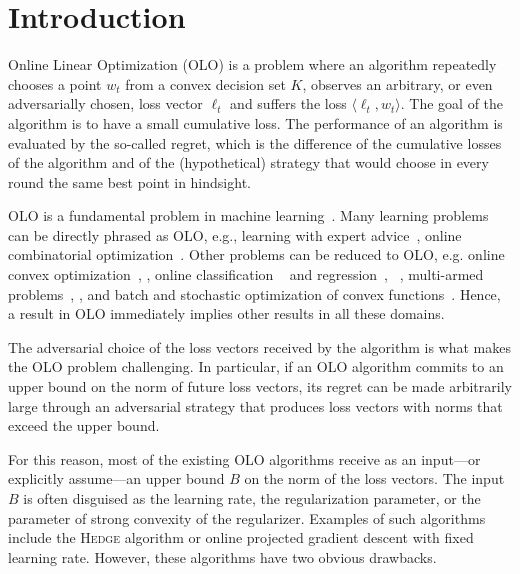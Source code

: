 \section{Introduction}
\label{section:introduction}

Online Linear Optimization (OLO) is a problem where an algorithm repeatedly
chooses a point $w_t$ from a convex decision set $K$, observes an arbitrary, or
even adversarially chosen, loss vector $\ell_t$ and suffers the loss $\langle
\ell_t, w_t \rangle$.  The goal of the algorithm is to have a small cumulative
loss. The performance of an algorithm is evaluated by the so-called regret,
which is the difference of the cumulative losses of the algorithm and of the
(hypothetical) strategy that would choose in every round the same best point in
hindsight.

OLO is a fundamental problem in machine
learning~\cite{Cesa-Bianchi-Lugosi-2006, Rakhlin-Sridharan-2009,
Shalev-Shwartz-2011}.  Many learning problems can be directly phrased as OLO,
e.g., learning with expert advice~\cite{Littlestone-Warmuth-1994, Vovk-1998,
Freund-Schapire-1997, Cesa-Bianchi-Haussler-Helmbold-Schapire-Warmuth-1997},
online combinatorial optimization~\cite{Kalai-Vempala-2005,
Helmbold-Warmuth-2009, Koolen-Warmuth-Kivinen-2010}. Other problems can be
reduced to OLO, e.g. online convex
optimization~\cite{Abernethy-Bartlett-Rakhlin-Tewari-2008},
\cite[Chapter~2]{Shalev-Shwartz-2011}, online classification
~\cite{Rosenblatt-1958,Freund-Schapire-1999} and
regression~\cite{Kivinen-Warmuth-1997},
~\cite[Chapters~11~and~12]{Cesa-Bianchi-Lugosi-2006}, multi-armed
problems~\cite[Chapter~6]{Cesa-Bianchi-Lugosi-2006},
\cite{Abernethy-Hazan-Rakhlin-2008, Bubeck-Cesa-Bianchi-2012}, and batch
and stochastic optimization of convex functions~\cite{Nemirovski-Yudin-1983,
Bubeck-2015}.  Hence, a result in OLO immediately implies other results in all
these domains.

The adversarial choice of the loss vectors received by the algorithm is what
makes the OLO problem challenging. In particular, if an OLO algorithm commits
to an upper bound on the norm of future loss vectors, its regret can be made
arbitrarily large through an adversarial strategy that produces loss vectors
with norms that exceed the upper bound.

For this reason, most of the existing OLO algorithms receive as an input---or
explicitly assume---an upper bound $B$ on the norm of the loss vectors.  The
input $B$ is often disguised as the learning rate, the regularization
parameter, or the parameter of strong convexity of the regularizer. Examples of
such algorithms include the \textsc{Hedge} algorithm or online projected
gradient descent with fixed learning rate.  However, these algorithms have two
obvious drawbacks.

